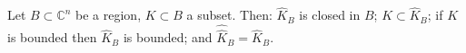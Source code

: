 Let $B \subset \mathbb{C}^n$ be a region, $K \subset B$ a subset. Then: $\hat{K}_B$ is closed in $B$; $K \subset \hat{K}_B$; if $K$ is bounded then $\hat{K}_B$ is bounded; and $\hat{\hat{K}}_B = \hat{K}_B$.
